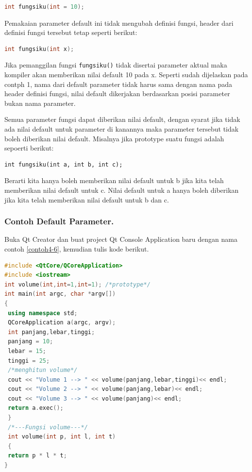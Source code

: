 \begin{lstlisting}[language=c++, numbers=none]
int fungsiku(int = 10);
\end{lstlisting}

Pemakaian parameter default ini tidak mengubah definisi fungsi, header
dari definisi fungsi tersebut tetap seperti berikut:

\begin{lstlisting}[language=c++, numbers=none]
int fungsiku(int x);
\end{lstlisting}

Jika pemanggilan fungsi \texttt{fungsiku()} tidak disertai parameter
aktual maka kompiler akan memberikan nilai default 10 pada x. Seperti
sudah dijelaskan pada contph 1, nama dari default parameter tidak harus
sama dengan nama pada header definisi fungsi, nilai default dikerjakan
berdasarkan posisi parameter bukan nama parameter.

Semua parameter fungsi dapat diberikan nilai default, dengan syarat jika
tidak ada nilai default untuk parameter di kanannya maka parameter
tersebut tidak boleh diberikan nilai default. Misalnya jika prototype
suatu fungsi adalah sepoerti berikut:

\begin{lstlisting}
int fungsiku(int a, int b, int c);
\end{lstlisting}

Berarti kita hanya boleh memberikan nilai default untuk b jika kita
telah memberikan nilai default untuk c. Nilai default untuk a hanya
boleh diberikan jika kita telah memberikan nilai default untuk b dan c.

\subsubsection*{Contoh Default Parameter.}

Buka Qt Creator dan buat project Qt Console Application baru dengan nama
contoh \ref{contoh4-6}, kemudian tulis kode berikut.

\begin{lstlisting}[language=c++, caption=Default Parameter, label=contoh4-6]
#include <QtCore/QCoreApplication>
#include <iostream>
int volume(int,int=1,int=1); /*prototype*/
int main(int argc, char *argv[])
{
 using namespace std;
 QCoreApplication a(argc, argv);
 int panjang,lebar,tinggi;
 panjang = 10;
 lebar = 15;
 tinggi = 25;
 /*menghitun volume*/
 cout << "Volume 1 --> " << volume(panjang,lebar,tinggi)<< endl;
 cout << "Volume 2 --> " << volume(panjang,lebar)<< endl;
 cout << "Volume 3 --> " << volume(panjang)<< endl;
 return a.exec();
 }
 /*---Fungsi volume---*/
 int volume(int p, int l, int t)
 {
 return p * l * t;
}

\end{lstlisting}

